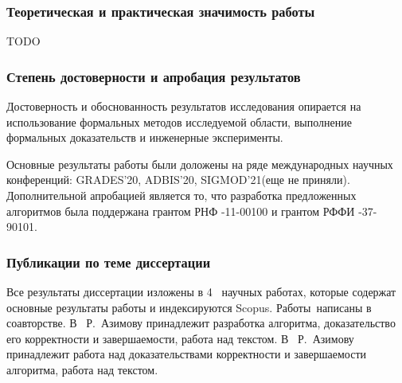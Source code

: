 \subsubsection*{\large{Теоретическая и практическая значимость работы}}
TODO




\subsubsection*{\large{Степень достоверности и апробация результатов}}
Достоверность и обоснованность результатов исследования опирается на использование формальных методов исследуемой области, выполнение формальных доказательств и инженерные эксперименты.

Основные результаты работы были доложены на ряде международных научных конференций: GRADES'20, ADBIS’20, SIGMOD'21(еще не приняли). Дополнительной апробацией является то, что разработка предложенных алгоритмов была поддержана грантом РНФ -11-00100 и грантом РФФИ -37-90101.

\subsubsection*{\large{Публикации по теме диссертации}}
 Все результаты диссертации изложены в 4~\cite{1,2,3,4} научных работах, которые содержат основные результаты работы и индексируются Scopus. Работы~\cite{1,2,3}написаны в соавторстве. В~\cite{1} Р.~Азимову принадлежит разработка алгоритма, доказательство его корректности и завершаемости, работа над текстом. В~\cite{2,3} Р.~Азимову принадлежит работа над доказательствами корректности и завершаемости алгоритма, работа над текстом.
 
